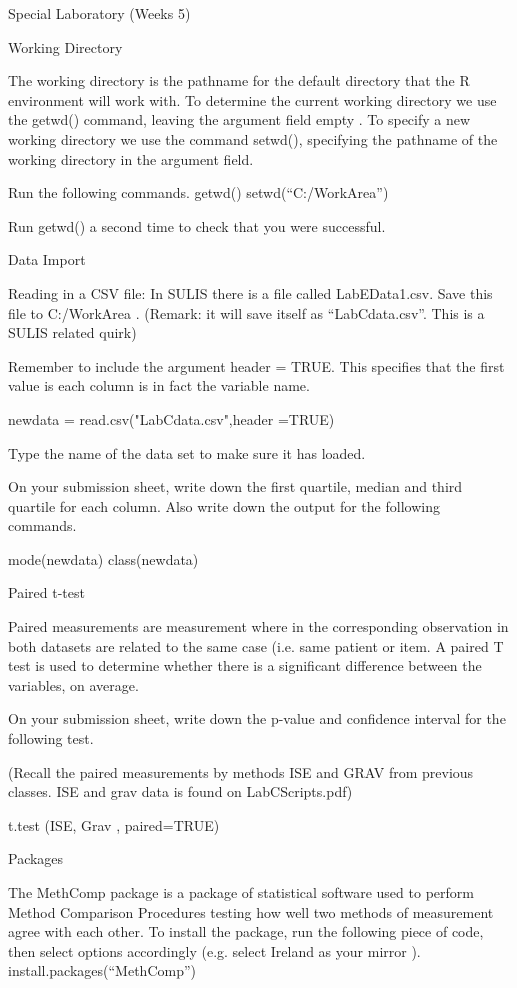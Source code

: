 Special Laboratory (Weeks 5)

Working Directory

The working directory is the pathname for the default directory that the R environment will work with. To determine the current working directory we use the getwd() command, leaving the argument field empty . To specify a new working directory we use the command setwd(), specifying the pathname of the working directory in the argument field. 

Run the following commands.
getwd()
setwd(“C:/WorkArea”)

Run getwd() a second time to check that you were successful.

Data Import

Reading in a CSV file: In SULIS there is a file called LabEData1.csv. Save this file to C:/WorkArea . (Remark: it will save itself as “LabCdata.csv”. This is a SULIS related quirk)

Remember to include the argument header = TRUE. This specifies that the first value is each column is in fact the variable name. 


newdata = read.csv("LabCdata.csv",header =TRUE)

Type the name of the data set to make sure it has loaded. 

On your submission sheet, write down the first quartile, median and third quartile for each column. Also write down the output for the following commands.

mode(newdata) 
class(newdata)

Paired t-test

Paired measurements are measurement where in the corresponding observation in both datasets are related to the same case (i.e. same patient or item. A paired T test is used to determine whether there is a significant difference between the variables, on average.


On your submission sheet, write down the p-value and confidence interval for the following test. 

(Recall the paired measurements by methods ISE and GRAV from previous classes. ISE and grav data is found on LabCScripts.pdf)

t.test (ISE, Grav , paired=TRUE)

Packages

The MethComp package is a package of statistical software used to perform Method Comparison Procedures testing how well two methods of measurement agree with each other.
To install the package, run the following piece of code, then select options accordingly (e.g. select Ireland as your mirror ).
install.packages(“MethComp”)

